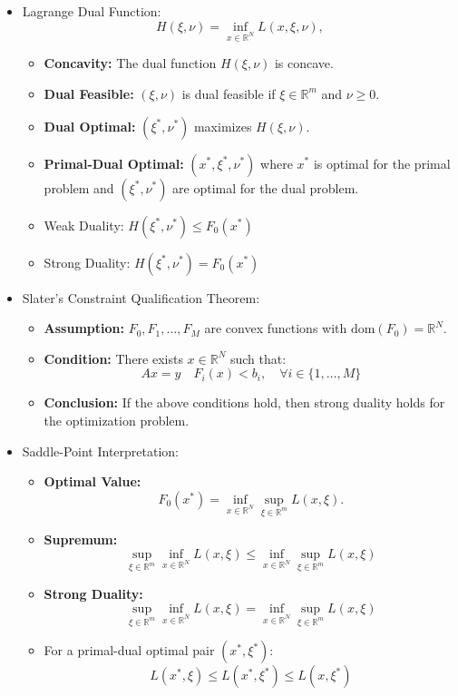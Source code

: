 \documentclass{article}
\begin{document}
\begin{itemize}
\item Lagrange Dual Function:
\[
H(\xi, \nu) = \inf_{x \in \mathbb{R}^N} L(x, \xi, \nu),
\]

\begin{itemize}
     \item \textbf{Concavity:} The dual function $H(\xi, \nu)$ is concave.
    \item \textbf{Dual Feasible:} $(\xi, \nu)$ is dual feasible if $\xi \in \mathbb{R}^m$ and $\nu \geq 0$.
    \item \textbf{Dual Optimal:} $(\xi^*, \nu^*)$ maximizes $H(\xi, \nu)$.
    \item \textbf{Primal-Dual Optimal:} $(x^*, \xi^*, \nu^*)$ where $x^*$ is optimal for the primal problem and $(\xi^*, \nu^*)$ are optimal for the dual problem.
    \item Weak Duality: \( H(\xi^{*}, \nu^{*}) \leq F_{0}(x^{*}) \)
    \item Strong Duality: \( H(\xi^{*}, \nu^{*}) = F_{0}(x^{*}) \)
\end{itemize}

\item Slater's Constraint Qualification Theorem:
\begin{itemize}
    \item \textbf{Assumption:} \( F_{0}, F_{1}, \ldots, F_{M} \) are convex functions with \( \text{dom}(F_{0}) = \mathbb{R}^{N} \).
    \item \textbf{Condition:} There exists \( x \in \mathbb{R}^{N} \) such that:
    \[
    Ax = y \quad F_{i}(x) < b_{i}, \quad \forall i \in \{1, \ldots, M\}
    \]
    \item \textbf{Conclusion:} If the above conditions hold, then strong duality holds for the optimization problem.
\end{itemize}

\item Saddle-Point Interpretation:
\begin{itemize}
     \item \textbf{Optimal Value:}
    \[
    F_{0}(x^{*}) = \inf_{x \in \mathbb{R}^{N}} \sup_{\xi \in \mathbb{R}^{m}} L(x, \xi).
    \]
 \item \textbf{Supremum:}
    \[
    \sup_{\xi \in \mathbb{R}^m} \inf_{x \in \mathbb{R}^N} L(x, \xi) \leq \inf_{x \in \mathbb{R}^N} \sup_{\xi \in \mathbb{R}^m} L(x, \xi)
    \]
     \item \textbf{Strong Duality:}
    \[
    \sup_{\xi \in \mathbb{R}^m} \inf_{x \in \mathbb{R}^N} L(x, \xi) = \inf_{x \in \mathbb{R}^N} \sup_{\xi \in \mathbb{R}^m} L(x, \xi)
    \]
    \item For a primal-dual optimal pair \((x^*, \xi^*)\):
\[
L(x^*, \xi) \leq L(x^*, \xi^*) \leq L(x, \xi^*)
\]
    

\end{itemize}
\end{itemize}
\end{document}
